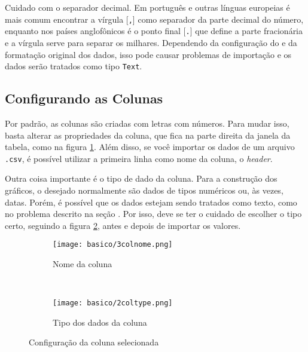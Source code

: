    \begin{lembrete}
        Cuidado com o separador decimal. Em português e outras línguas europeias é mais comum encontrar a vírgula [\texttt{,}] como separador da parte decimal do número, enquanto nos países anglofônicos é o ponto final [\texttt{.}] que define a parte fracionária e a vírgula serve para separar os milhares. Dependendo da configuração do \software e da formatação original dos dados, isso pode causar problemas de importação e os dados serão tratados como tipo \texttt{Text}.
    \end{lembrete}


\subsection{Configurando as Colunas} \label{sec:basico:renome}

    Por padrão, as colunas são criadas com letras com números. Para mudar isso, basta alterar as propriedades da coluna, que fica na parte direita da janela da tabela, como na figura \ref{fig:basico:colnome}. Além disso, se você importar os dados de um arquivo \texttt{.csv}, é possível utilizar a primeira linha como nome da coluna, o \textit{header}.

    Outra coisa importante é o tipo de dado da coluna. Para a construção dos gráficos, o desejado normalmente são dados de tipos numéricos ou, às vezes, datas. Porém, é possível que os dados estejam sendo tratados como texto, como no problema descrito na seção . Por isso, deve se ter o cuidado de escolher o tipo certo, seguindo a figura \ref{fig:basico:coltipo}, antes e depois de importar os valores.

    \begin{figure}[htbp]
        \begin{subfigure}{0.45\textwidth}
            \centering
            \texttt{[image: basico/3colnome.png]}

            \caption{Nome da coluna}
            \label{fig:basico:colnome}
        \end{subfigure}
        ~
        \centering
        \begin{subfigure}{0.45\textwidth}
            \centering
            \texttt{[image: basico/2coltype.png]}

            \caption{Tipo dos dados da coluna}
            \label{fig:basico:coltipo}
        \end{subfigure}
        \caption{Configuração da coluna selecionada}
        \label{fig:basico:config}
    \end{figure}
